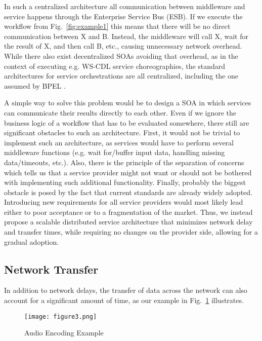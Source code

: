 \documentclass[10pt, conference, compsocconf]{IEEEtran}
\newcommand{\oneImage}{3.2in}
\begin{document}
\noindent In such a centralized architecture \cite{Papazoglou2003} all communication between middleware and service happens through the Enterprise Service Bus (ESB).
If we execute the workflow from Fig.~\ref{fig:example1} this means that there will be no direct communication between X and B.
Instead, the middleware will call X, wait for the result of X, and then call B, etc.,
	causing unnecessary network overhead.
While there also exist decentralized SOAs avoiding that overhead, as in the context of executing e.g. WS-CDL \cite{WS-CDL2005} service choreographies,
	the standard architectures for service orchestrations are all centralized, including the one assumed by BPEL \cite{BPEL2006}.

A simple way to solve this problem would be to design a SOA in which services can communicate their results directly to each other.
Even if we ignore the business logic of a workflow that has to be evaluated somewhere,
	there still are significant obstacles to such an architecture.
First, it would not be trivial to implement such an architecture,
	as services would have to perform several middleware functions (e.g. wait for/buffer input data, handling missing data/timeouts, etc.).
Also, there is the principle of the separation of concerns
	which tells us that a service provider might not want or should not be bothered with implementing such additional functionality.
Finally, probably the biggest obstacle is posed by the fact that current standards are already widely adopted.
Introducing new requirements for all service providers would most likely lead either to poor acceptance or to a fragmentation of the market.
Thus, we instead propose a scalable distributed service architecture that minimizes network delay and transfer times,
	while requiring no changes on the provider side, allowing for a gradual adoption.

\subsection{Network Transfer}
\noindent In addition to network delays,
	the transfer of data across the network can also account for a significant amount of time,
		as our example in Fig.~\ref{fig:exampleTransfer} illustrates.

\begin{figure}[htb!]
	\centering
  \texttt{[image: figure3.png]}
	\caption{Audio Encoding Example}
  \label{fig:exampleTransfer}
\end{figure}
\end{document}
